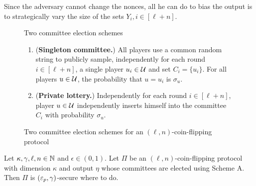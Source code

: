     Since the adversary cannot change the nonces, 
    all he can do to bias the output 
    is to strategically vary the size of the sets $Y_i, i \in [\ell + n]$.

    \begin{figure}[h]
        \begin{framed}
            \begin{center}
                Two committee election schemes                
            \end{center}
            \begin{enumerate}[label=\textbf{Scheme \Alph*:},ref=\Alph*,leftmargin=6em]
                \item \label{lottery:public}
                (\textbf{Singleton committee.})
                All players use a common random string to 
                publicly sample, 
                independently for each round $i \in [\ell + n]$, 
                a single player $u_i \in \mathcal{U}$ and  
                set $C_i = \{u_i\}$. 
                For all players $u \in \mathcal{U}$, 
                the probability that $u = u_i$ is $\sigma_u$.

                \item \label{lottery:private}
                (\textbf{Private lottery.})
                Independently for each round $i \in [\ell + n]$, 
                player $u \in \mathcal{U}$ 
                independently inserts himself 
                into the committee $C_i$ 
                with probability $\sigma_u$. 
            \end{enumerate}
        \end{framed}
        \caption{Two committee election schemes for an $(\ell, n)$-coin-flipping protocol}
        \label{fig:leader-election-schemes}
    \end{figure}


    \begin{theorem}
        Let $\kappa, \gamma, \ell, n \in \mathbb{N}$ and $\epsilon \in (0,1)$.
        Let $\Pi$ be an $(\ell, n)$-coin-flipping protocol with dimension $\kappa$ 
        and output $\eta$ whose committees are elected using Scheme A.
        Then $\Pi$ is $(\mathsf{\varepsilon}_p, \gamma)$-secure where {\color{red} to do}.
    \end{theorem}

